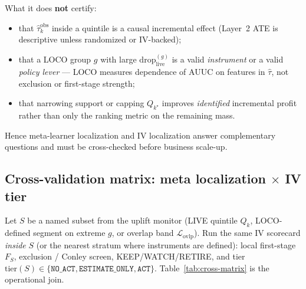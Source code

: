 What it does \textbf{not} certify:
\begin{itemize}\itemsep2pt
  \item that $\widehat{\tau}^{\mathrm{obs}}_k$ inside a quintile is a
        causal incremental effect (Layer~2 ATE is descriptive unless
        randomized or IV-backed);
  \item that a LOCO group $g$ with large $\mathrm{drop}_{\mathrm{live}}^{(g)}$
        is a valid \emph{instrument} or a valid \emph{policy lever} ---
        LOCO measures dependence of AUUC on features in $\hat\tau$, not
        exclusion or first-stage strength;
  \item that narrowing support or capping $Q_{k^\star}$ improves
        \emph{identified} incremental profit rather than only the ranking
        metric on the remaining mass.
\end{itemize}
Hence meta-learner localization and IV localization answer complementary
questions and must be cross-checked before business scale-up.

\subsection{Cross-validation matrix: meta localization $\times$ IV tier}
\label{sec:cross-validate}

Let $S$ be a named subset from the uplift monitor
(LIVE quintile $Q_k$, LOCO-defined segment on extreme $g$, or overlap
band $\mathcal{L}_{\mathrm{ovlp}}$).
Run the same IV scorecard \emph{inside} $S$ (or the nearest stratum where
instruments are defined): local first-stage $F_S$, exclusion / Conley
screen, KEEP/WATCH/RETIRE, and tier
$\mathrm{tier}(S)\in\{\texttt{NO\_ACT},\texttt{ESTIMATE\_ONLY},\texttt{ACT}\}$.
Table~\ref{tab:cross-matrix} is the operational join.

